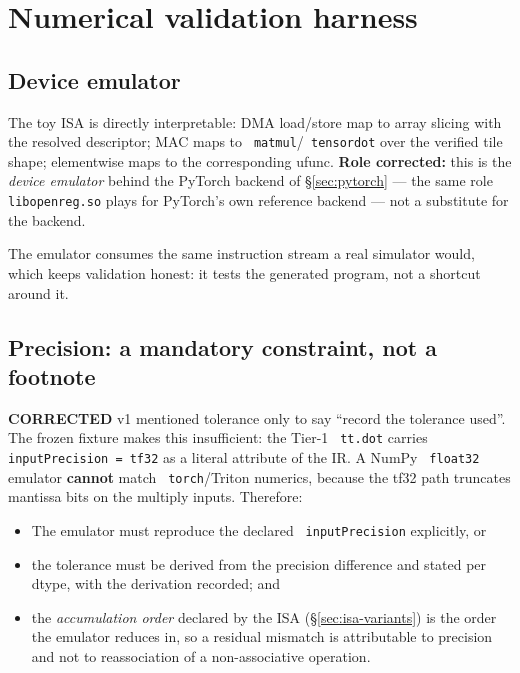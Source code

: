 \documentclass[11pt,a4paper]{article}
\newcommand{\code}[1]{\texttt{\small\hyphenchar\font=45 #1}}
\newcommand{\falsified}{\textbf{\textcolor{red!75!black}{CORRECTED}}}
\begin{document}
\section{Numerical validation harness}\label{sec:validation}

\subsection{Device emulator}

The toy ISA is directly interpretable: DMA load/store map to array slicing with the resolved descriptor; MAC
maps to \code{matmul}/\code{tensordot} over the verified tile shape; elementwise maps to the corresponding
ufunc. \textbf{Role corrected:} this is the \emph{device emulator} behind the PyTorch backend of
\S\ref{sec:pytorch} --- the same role \code{libopenreg.so} plays for PyTorch's own reference backend --- not
a substitute for the backend.

\noindent The emulator consumes the same instruction stream a real simulator would, which keeps validation
honest: it tests the generated program, not a shortcut around it.

\subsection{Precision: a mandatory constraint, not a footnote}\label{sec:precision}

\falsified{} v1 mentioned tolerance only to say ``record the tolerance used''. The frozen fixture makes this
insufficient: the Tier-1 \code{tt.dot} carries \code{inputPrecision = tf32} as a literal attribute of the
IR. A NumPy \code{float32} emulator \textbf{cannot} match \code{torch}/Triton numerics, because the tf32 path
truncates mantissa bits on the multiply inputs. Therefore:

\begin{itemize}[leftmargin=1.3em,itemsep=0.25em]
\item The emulator must reproduce the declared \code{inputPrecision} explicitly, or
\item the tolerance must be derived from the precision difference and stated per dtype, with the derivation
      recorded; and
\item the \emph{accumulation order} declared by the ISA (\S\ref{sec:isa-variants}) is the order the emulator
      reduces in, so a residual mismatch is attributable to precision and not to reassociation of a
      non-associative operation.
\end{itemize}
\end{document}
